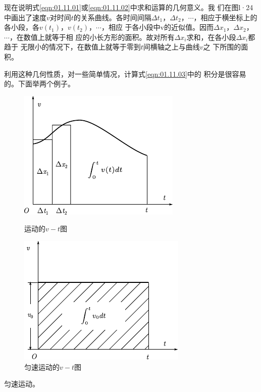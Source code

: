     现在说明式\eqref{eqn:01.11.01}或\eqref{eqn:01.11.02}中求和运算的几何意义。我
们在图l·24 中画出了速度$v$对时间$t$的关系曲线。各时间间隔$\Delta t_1$，$\Delta t_2$，$\cdots$，相应于横坐标上的各小段，各$v(t_1)$，$v(t_2)$，$\cdots$，相应
于各小段中v的近似值。因而$\Delta x_1$，$\Delta x_2$，$\cdots$，在数值上就等于相
应的小长方形的面积。故对所有$\Delta x_i$求和，在各小段$\Delta x_i$都趋于
无限小的情况下，在数值上就等于零到$t$间横轴之上与曲线$v$之
下所围的面积。

    利用这种几何性质，对一些简单情况，计算式\eqref{eqn:01.11.03}中的
积分是很容易的。下面举两个例子。
\begin{figure}[!h]
    \begin{minipage}[b]{14em}
        \centering
        \includegraphics{figure/fig01.24}
        \caption{运动的$v-t$图}
        \label{fig:01.24}
    \end{minipage}\hfill
    \begin{minipage}[b]{14em}
        \centering
        \includegraphics{figure/fig01.25}
        \caption{匀速运动的$v-t$图}
        \label{fig:01.25}
    \end{minipage}
\end{figure}

\example 匀速运动。

